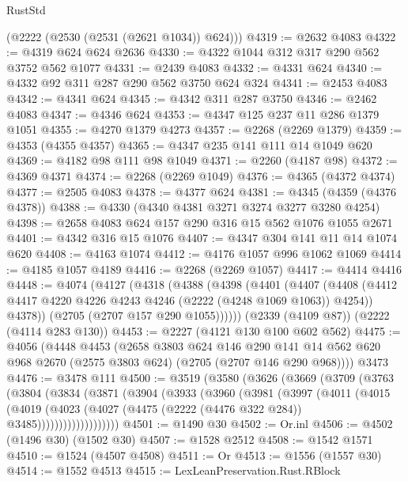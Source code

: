 \begin{lexlean}{RustStd}
\begin{coremodule}
      (@2222 (@2530 (@2531 (@2621 @1034)) @624)))
@4319 := @2632 @4083
@4322 := @4319 @624 @624 @2636
@4330 := @4322 @1044 @312 @317 @290 @562 @3752 @562 @1077
@4331 := @2439 @4083
@4332 := @4331 @624
@4340 := @4332 @92 @311 @287 @290 @562 @3750 @624 @324
@4341 := @2453 @4083
@4342 := @4341 @624
@4345 := @4342 @311 @287 @3750
@4346 := @2462 @4083
@4347 := @4346 @624
@4353 := @4347 @125 @237 @11 @286 @1379 @1051
@4355 := @4270 @1379 @4273
@4357 := @2268 (@2269 @1379)
@4359 := @4353 (@4355 @4357)
@4365 := @4347 @235 @141 @111 @14 @1049 @620
@4369 := @4182 @98 @111 @98 @1049
@4371 := @2260 (@4187 @98)
@4372 := @4369 @4371
@4374 := @2268 (@2269 @1049)
@4376 := @4365 (@4372 @4374)
@4377 := @2505 @4083
@4378 := @4377 @624
@4381 := @4345 (@4359 (@4376 @4378))
@4388 := @4330 (@4340 @4381 @3271 @3274 @3277 @3280 @4254)
@4398 := @2658 @4083 @624 @157 @290 @316 @15 @562 @1076 @1055 @2671
@4401 := @4342 @316 @15 @1076
@4407 := @4347 @304 @141 @11 @14 @1074 @620
@4408 := @4163 @1074
@4412 := @4176 @1057 @996 @1062 @1069
@4414 := @4185 @1057 @4189
@4416 := @2268 (@2269 @1057)
@4417 := @4414 @4416
@4448 := @4074
    (@4127
      (@4318
        (@4388
          (@4398
            (@4401
              (@4407
                (@4408 (@4412 @4417 @4220 @4226 @4243 @4246 (@2222 (@4248 @1069 @1063)) @4254))
                @4378))
            (@2705 (@2707 @157 @290 @1055))))))
    (@2339 (@4109 @87))
    (@2222 (@4114 @283 @130))
@4453 := @2227 (@4121 @130 @100 @602 @562)
@4475 := @4056
    (@4448
      @4453
      (@2658
        @3803
        @624
        @146
        @290
        @141
        @14
        @562
        @620
        @968
        @2670
        (@2575 @3803 @624)
        (@2705 (@2707 @146 @290 @968))))
    @3473
@4476 := @3478 @111
@4500 := @3519
    (@3580
      (@3626
        (@3669
          (@3709
            (@3763
              (@3804
                (@3834
                  (@3871
                    (@3904
                      (@3933
                        (@3960
                          (@3981
                            (@3997
                              (@4011
                                (@4015
                                  (@4019
                                    (@4023
                                      (@4027
                                        (@4475 (@2222 (@4476 @322 @284)) @3485)))))))))))))))))))
@4501 := @1490 @30
@4502 := Or.inl
@4506 := @4502 (@1496 @30) (@1502 @30)
@4507 := @1528 @2512
@4508 := @1542 @1571
@4510 := @1524 (@4507 @4508)
@4511 := Or
@4513 := @1556 (@1557 @30)
@4514 := @1552 @4513
@4515 := LexLeanPreservation.Rust.RBlock

\end{coremodule}
\end{lexlean}
